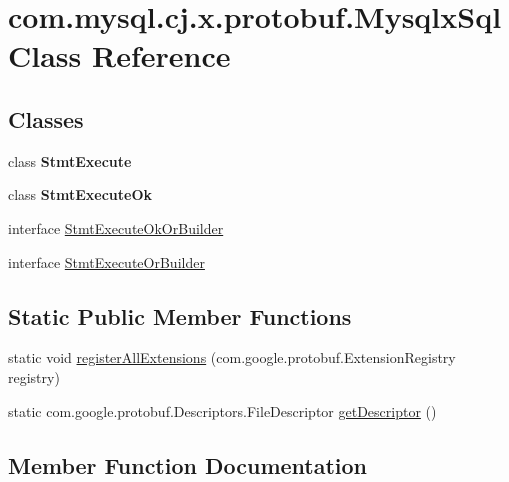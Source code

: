 \hypertarget{classcom_1_1mysql_1_1cj_1_1x_1_1protobuf_1_1_mysqlx_sql}{}\section{com.\+mysql.\+cj.\+x.\+protobuf.\+Mysqlx\+Sql Class Reference}
\label{classcom_1_1mysql_1_1cj_1_1x_1_1protobuf_1_1_mysqlx_sql}
\subsection*{Classes}
\begin{DoxyCompactItemize}
\item 
class {\bfseries Stmt\+Execute}
\item 
class {\bfseries Stmt\+Execute\+Ok}
\item 
interface \mbox{\hyperlink{interfacecom_1_1mysql_1_1cj_1_1x_1_1protobuf_1_1_mysqlx_sql_1_1_stmt_execute_ok_or_builder}{Stmt\+Execute\+Ok\+Or\+Builder}}
\item 
interface \mbox{\hyperlink{interfacecom_1_1mysql_1_1cj_1_1x_1_1protobuf_1_1_mysqlx_sql_1_1_stmt_execute_or_builder}{Stmt\+Execute\+Or\+Builder}}
\end{DoxyCompactItemize}
\subsection*{Static Public Member Functions}
\begin{DoxyCompactItemize}
\item 
static void \mbox{\hyperlink{classcom_1_1mysql_1_1cj_1_1x_1_1protobuf_1_1_mysqlx_sql_abf06fecb34bc8f5994a1b8f2098c97cf}{register\+All\+Extensions}} (com.\+google.\+protobuf.\+Extension\+Registry registry)
\item 
static com.\+google.\+protobuf.\+Descriptors.\+File\+Descriptor \mbox{\hyperlink{classcom_1_1mysql_1_1cj_1_1x_1_1protobuf_1_1_mysqlx_sql_a767add83f70d0d54e80f197365cf75dc}{get\+Descriptor}} ()
\end{DoxyCompactItemize}


\subsection{Member Function Documentation}
\mbox{\label{classcom_1_1mysql_1_1cj_1_1x_1_1protobuf_1_1_mysqlx_sql_a767add83f70d0d54e80f197365cf75dc}} 

